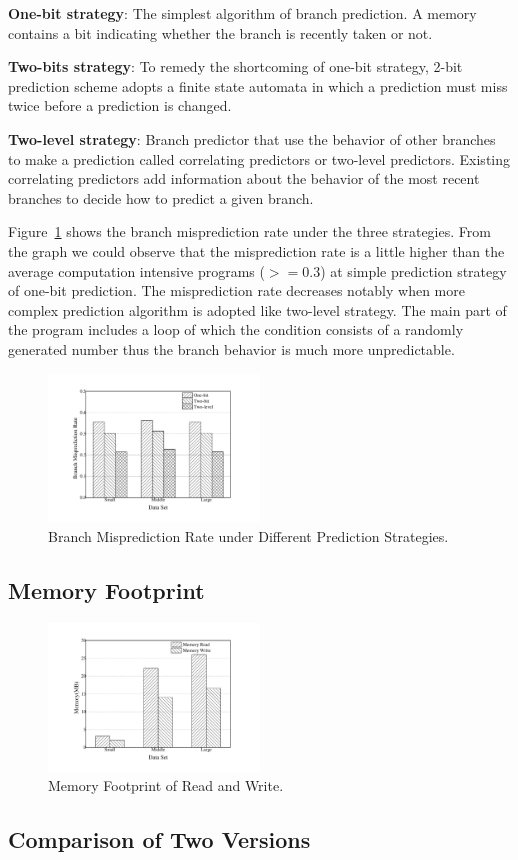 \begin{compactitem}
\item \textbf{One-bit strategy}: The simplest algorithm of branch prediction. A memory contains a bit indicating whether the branch is recently taken or not.
\item \textbf{Two-bits strategy}: To remedy the shortcoming of one-bit strategy, 2-bit prediction scheme adopts a finite state automata in which a prediction must miss twice before a prediction is changed.
\item \textbf{Two-level strategy}: Branch predictor that use the behavior of other branches to make a prediction called correlating predictors or two-level predictors. Existing correlating predictors add information about the behavior of the most recent branches to decide how to predict a given branch.
\end{compactitem}
Figure~\ref{fig:predict} shows the branch misprediction rate under the three strategies. From the graph we could observe that the misprediction rate is a little higher than the average computation intensive programs ($>=0.3$) at simple prediction strategy of one-bit prediction. The misprediction rate decreases notably when more complex prediction algorithm is adopted like two-level strategy. The main part of the program includes a loop of which the condition consists of a randomly generated number thus the branch behavior is much more unpredictable.

\begin{figure}[ht]
\centering
\includegraphics[width=0.50\textwidth]{graph/predict.pdf}
\caption{Branch Misprediction Rate under Different Prediction Strategies.}
\label{fig:predict}
\end{figure}

\subsection{Memory Footprint}
\label{sec:memory}

\begin{figure}[ht]
\centering
\includegraphics[width=0.50\textwidth]{graph/memory.pdf}
\caption{Memory Footprint of Read and Write.}
\label{fig:memory}
\end{figure}
\subsection{Comparison of Two Versions}
\label{sec:comparison} 